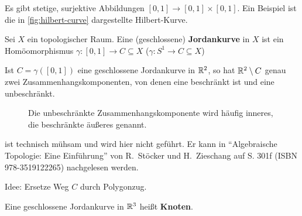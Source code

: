 \begin{beispiel}%
    Es gibt stetige, surjektive Abbildungen 
    $[0,1] \rightarrow [0,1] \times [0,1]$. Ein Beispiel ist die
    in \cref{fig:hilbert-curve} dargestellte Hilbert-Kurve.

    
\end{beispiel}

\begin{definition}%
    Sei $X$ ein topologischer Raum. Eine (geschlossene)
    \textbf{Jordankurve} in $X$ ist ein Homöomorphismus 
    $\gamma: [0,1] \rightarrow C \subseteq X$
    ($\gamma: S^1 \rightarrow C \subseteq X$)
\end{definition}

\begin{satz}
    Ist $C=\gamma([0,1])$ eine geschlossene Jordankurve in $\mathbb{R}^2$,
    so hat $\mathbb{R}^2 \setminus C$ genau zwei Zusammenhangskomponenten,
    von denen eine beschränkt ist und eine unbeschränkt.
\end{satz}

\begin{figure}[htp]
    \centering
     
    \label{fig:jordan-kurvensatz}
    \caption{Die unbeschränkte Zusammenhangskomponente wird häufig inneres, die beschränkte äußeres genannt.}
\end{figure}

\begin{beweis}
    ist technisch mühsam und wird hier nicht geführt. Er kann
    in \enquote{Algebraische Topologie: Eine Einführung} von R.~Stöcker
    und H.~Zieschang auf S. 301f (ISBN 978-3519122265) nachgelesen werden.

    Idee: Ersetze Weg $C$ durch Polygonzug.
\end{beweis}

\begin{definition}%
    Eine geschlossene Jordankurve in $\mathbb{R}^3$ heißt \textbf{Knoten}.
\end{definition}

